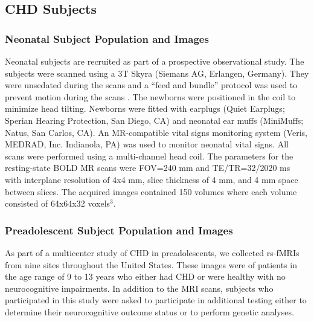 \subsection{CHD Subjects}

\subsubsection{Neonatal Subject Population and Images}

Neonatal subjects are recruited as part of a prospective observational study. The subjects were scanned using a 3T Skyra (Siemans AG, Erlangen, Germany). They were unsedated during the scans and a ``feed and bundle'' protocol was used to prevent motion during the scans \cite{Windram2011}. The newborns were positioned in the coil to minimize head tilting. Newborns were fitted with earplugs (Quiet Earplugs; Sperian Hearing Protection, San Diego, CA) and neonatal ear muffs (MiniMuffs; Natus, San Carlos, CA). An MR-compatible vital signs monitoring system (Veris, MEDRAD, Inc. Indianola, PA) was used to monitor neonatal vital signs. All scans were performed using a multi-channel head coil. The parameters for the resting-state BOLD MR scans were FOV=240 mm and TE/TR=32/2020 ms with interplane resolution of 4x4 mm, slice thickness of 4 mm, and 4 mm space between slices. The acquired images contained 150 volumes where each volume consisted of 64x64x32 voxels$^3$.

\subsubsection{Preadolescent Subject Population and Images}

As part of a multicenter study of CHD in preadolescents, we collected rs-fMRIs from nine sites throughout the United States. These images were of patients in the age range of 9 to 13 years who either had CHD or were healthy with no neurocognitive impairments. In addition to the MRI scans, subjects who participated in this study were asked to participate in additional testing  either to determine their neurocognitive outcome status or to perform genetic analyses. %



